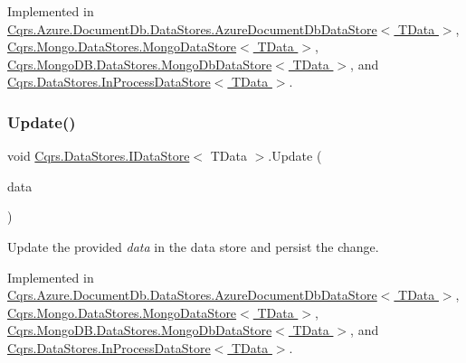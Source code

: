 Implemented in \hyperlink{classCqrs_1_1Azure_1_1DocumentDb_1_1DataStores_1_1AzureDocumentDbDataStore_a0d72cc318e98e01b3dbed86d412a8778_a0d72cc318e98e01b3dbed86d412a8778}{Cqrs.\+Azure.\+Document\+Db.\+Data\+Stores.\+Azure\+Document\+Db\+Data\+Store$<$ T\+Data $>$}, \hyperlink{classCqrs_1_1Mongo_1_1DataStores_1_1MongoDataStore_a878966ea796321cae54c3c619e3178d5_a878966ea796321cae54c3c619e3178d5}{Cqrs.\+Mongo.\+Data\+Stores.\+Mongo\+Data\+Store$<$ T\+Data $>$}, \hyperlink{classCqrs_1_1MongoDB_1_1DataStores_1_1MongoDbDataStore_ac0cb8626e8f8ab0275a31e88a920ee3e_ac0cb8626e8f8ab0275a31e88a920ee3e}{Cqrs.\+Mongo\+D\+B.\+Data\+Stores.\+Mongo\+Db\+Data\+Store$<$ T\+Data $>$}, and \hyperlink{classCqrs_1_1DataStores_1_1InProcessDataStore_acd350f7abef7311064434ae31a50755b_acd350f7abef7311064434ae31a50755b}{Cqrs.\+Data\+Stores.\+In\+Process\+Data\+Store$<$ T\+Data $>$}.

\mbox{\label{interfaceCqrs_1_1DataStores_1_1IDataStore_a6d5d4dd572de8db01ff0c48d37faefa7_a6d5d4dd572de8db01ff0c48d37faefa7}} 
\subsubsection{\texorpdfstring{Update()}{Update()}}
{\footnotesize\ttfamily void \hyperlink{interfaceCqrs_1_1DataStores_1_1IDataStore}{Cqrs.\+Data\+Stores.\+I\+Data\+Store}$<$ T\+Data $>$.Update (\begin{DoxyParamCaption}\item[{T\+Data}]{data }\end{DoxyParamCaption})}



Update the provided {\itshape data}  in the data store and persist the change. 



Implemented in \hyperlink{classCqrs_1_1Azure_1_1DocumentDb_1_1DataStores_1_1AzureDocumentDbDataStore_a55f504ed5094e3041a266b958424b1a2_a55f504ed5094e3041a266b958424b1a2}{Cqrs.\+Azure.\+Document\+Db.\+Data\+Stores.\+Azure\+Document\+Db\+Data\+Store$<$ T\+Data $>$}, \hyperlink{classCqrs_1_1Mongo_1_1DataStores_1_1MongoDataStore_a03aac0495445d34f124db893cd09cbd8_a03aac0495445d34f124db893cd09cbd8}{Cqrs.\+Mongo.\+Data\+Stores.\+Mongo\+Data\+Store$<$ T\+Data $>$}, \hyperlink{classCqrs_1_1MongoDB_1_1DataStores_1_1MongoDbDataStore_af86a3df56e2df92fb9ef880ff4fa5f16_af86a3df56e2df92fb9ef880ff4fa5f16}{Cqrs.\+Mongo\+D\+B.\+Data\+Stores.\+Mongo\+Db\+Data\+Store$<$ T\+Data $>$}, and \hyperlink{classCqrs_1_1DataStores_1_1InProcessDataStore_af70e6f6e5aabc24ee12ef3d2bcd3bf60_af70e6f6e5aabc24ee12ef3d2bcd3bf60}{Cqrs.\+Data\+Stores.\+In\+Process\+Data\+Store$<$ T\+Data $>$}.

